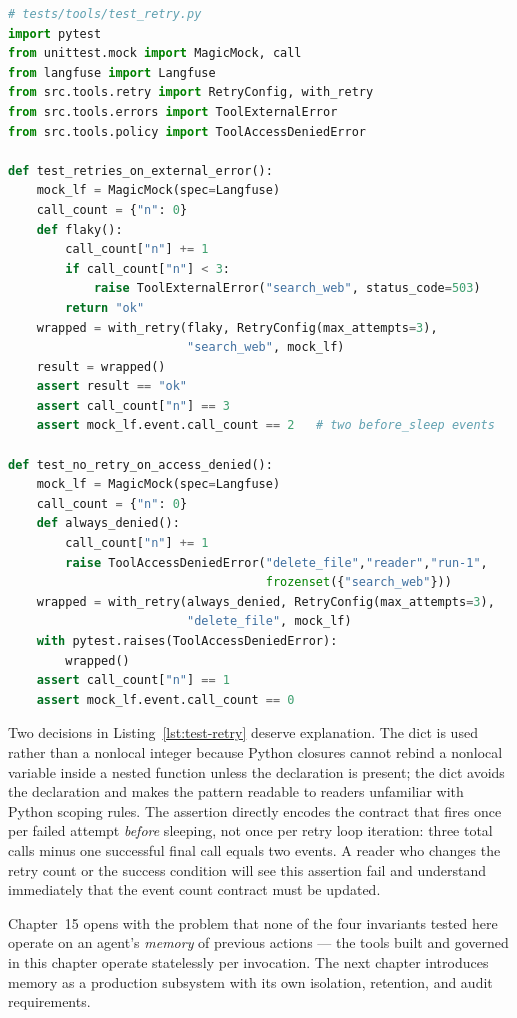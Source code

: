 \begin{lstlisting}[language=Python,
  caption={Retry tests: type-selective retry and Langfuse event count},
  label={lst:test-retry}]
# tests/tools/test_retry.py
import pytest
from unittest.mock import MagicMock, call
from langfuse import Langfuse
from src.tools.retry import RetryConfig, with_retry
from src.tools.errors import ToolExternalError
from src.tools.policy import ToolAccessDeniedError

def test_retries_on_external_error():
    mock_lf = MagicMock(spec=Langfuse)
    call_count = {"n": 0}
    def flaky():
        call_count["n"] += 1
        if call_count["n"] < 3:
            raise ToolExternalError("search_web", status_code=503)
        return "ok"
    wrapped = with_retry(flaky, RetryConfig(max_attempts=3),
                         "search_web", mock_lf)
    result = wrapped()
    assert result == "ok"
    assert call_count["n"] == 3
    assert mock_lf.event.call_count == 2   # two before_sleep events

def test_no_retry_on_access_denied():
    mock_lf = MagicMock(spec=Langfuse)
    call_count = {"n": 0}
    def always_denied():
        call_count["n"] += 1
        raise ToolAccessDeniedError("delete_file","reader","run-1",
                                    frozenset({"search_web"}))
    wrapped = with_retry(always_denied, RetryConfig(max_attempts=3),
                         "delete_file", mock_lf)
    with pytest.raises(ToolAccessDeniedError):
        wrapped()
    assert call_count["n"] == 1
    assert mock_lf.event.call_count == 0
\end{lstlisting}

Two decisions in Listing~\ref{lst:test-retry} deserve explanation.
The  dict is used rather than a nonlocal integer because
Python closures cannot rebind a nonlocal variable inside a nested function
unless the  declaration is present; the dict avoids the
declaration and makes the pattern readable to readers unfamiliar with
Python scoping rules. The assertion 
directly encodes the contract that  fires once per
failed attempt \emph{before} sleeping, not once per retry loop iteration:
three total calls minus one successful final call equals two
 events. A reader who changes the retry count or the
success condition will see this assertion fail and understand immediately
that the event count contract must be updated.

Chapter~15 opens with the problem that none of the four invariants tested
here operate on an agent's \emph{memory} of previous actions --- the tools
built and governed in this chapter operate statelessly per invocation. The
next chapter introduces memory as a production subsystem with its own
isolation, retention, and audit requirements.
